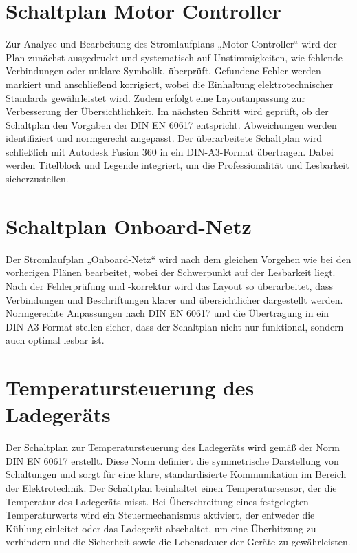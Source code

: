 \section*{Schaltplan Motor Controller}
Zur Analyse und Bearbeitung des Stromlaufplans „Motor Controller“ wird der Plan zunächst ausgedruckt und systematisch auf Unstimmigkeiten, wie fehlende Verbindungen oder unklare Symbolik, überprüft. Gefundene Fehler werden markiert und anschließend korrigiert, wobei die Einhaltung elektrotechnischer Standards gewährleistet wird. Zudem erfolgt eine Layoutanpassung zur Verbesserung der Übersichtlichkeit. Im nächsten Schritt wird geprüft, ob der Schaltplan den Vorgaben der DIN EN 60617 entspricht. Abweichungen werden identifiziert und normgerecht angepasst. Der überarbeitete Schaltplan wird schließlich mit Autodesk Fusion 360 in ein DIN-A3-Format übertragen. Dabei werden Titelblock und Legende integriert, um die Professionalität und Lesbarkeit sicherzustellen. 
 
\addtocounter{page}{1} 
\section*{Schaltplan Onboard-Netz}
Der Stromlaufplan „Onboard-Netz“ wird nach dem gleichen Vorgehen wie bei den vorherigen Plänen bearbeitet, wobei der Schwerpunkt auf der Lesbarkeit liegt. Nach der Fehlerprüfung und -korrektur wird das Layout so überarbeitet, dass Verbindungen und Beschriftungen klarer und übersichtlicher dargestellt werden. Normgerechte Anpassungen nach DIN EN 60617 und die Übertragung in ein DIN-A3-Format stellen sicher, dass der Schaltplan nicht nur funktional, sondern auch optimal lesbar ist.
 
\addtocounter{page}{1} 
\section*{Temperatursteuerung des Ladegeräts}
Der Schaltplan zur Temperatursteuerung des Ladegeräts wird gemäß der Norm DIN EN 60617 erstellt. Diese Norm definiert die symmetrische Darstellung von Schaltungen und sorgt für eine klare, standardisierte Kommunikation im Bereich der Elektrotechnik. Der Schaltplan beinhaltet einen Temperatursensor, der die Temperatur des Ladegeräts misst. Bei Überschreitung eines festgelegten Temperaturwerts wird ein Steuermechanismus aktiviert, der entweder die Kühlung einleitet oder das Ladegerät abschaltet, um eine Überhitzung zu verhindern und die Sicherheit sowie die Lebensdauer der Geräte zu gewährleisten.
 
\addtocounter{page}{1} 
